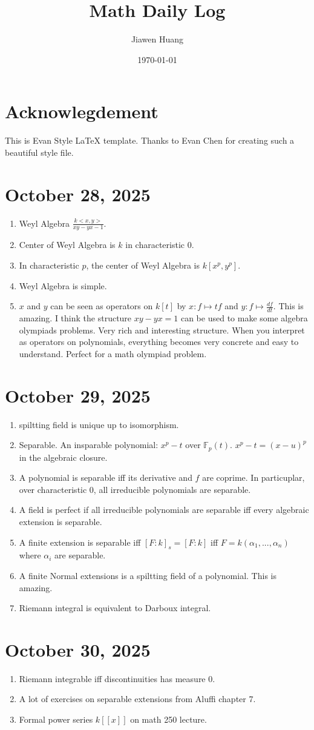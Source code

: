 \documentclass[15pt]{scrartcl}
\begin{document}
\title{Math Daily Log}
\date{\today}
\author{Jiawen Huang}
\maketitle
\section*{Acknowlegdement}
This is Evan Style LaTeX template. Thanks to Evan Chen for creating such a beautiful style file.
\section*{October 28, 2025}
\begin{enumerate}
\item Weyl Algebra $\frac{k<x,y>}{xy-yx-1}$. 
\item Center of Weyl Algebra is $k$ in characteristic 0.
\item In characteristic $p$, the center of Weyl Algebra is $k[x^p,y^p]$.
\item Weyl Algebra is simple.
\item $x$ and $y$ can be seen as operators on $k[t]$ by $x:f\mapsto tf$ and $y:f\mapsto \frac{df}{dt}$. This is amazing. 
I think the structure $xy-yx=1$ can be used to make some algebra olympiads problems. Very rich and interesting structure. 
When you interpret as operators on polynomials, everything becomes very concrete and easy to understand. Perfect for a math olympiad problem.

\end{enumerate}

\section*{October 29, 2025}
\begin{enumerate}
\item spiltting field is unique up to isomorphism.
\item Separable. An insparable polynomial: $x^p-t$ over $\mathbb{F}_p(t)$. $x^p-t=(x-u)^p$ in the algebraic closure. 
\item A polynomial is separable iff its derivative and $f$ are coprime. In particuplar, over characteristic 0, all irreducible polynomials are separable.
\item A field is perfect if all irreducible polynomials are separable iff every algebraic extension is separable. 
\item A finite extension is separable iff $[F:k]_s=[F:k]$ iff $F=k(\alpha_1,...,\alpha_n)$ where $\alpha_i$ are separable.
\item A finite Normal extensions is a spiltting field of a polynomial. This is amazing. 
\item Riemann integral is equivalent to Darboux integral.
\end{enumerate}
\section*{October 30, 2025}
\begin{enumerate}
\item Riemann integrable iff discontinuities has measure 0.
\item A lot of exercises on separable extensions from Aluffi chapter 7. 
\item Formal power series $k[[x]]$ on math 250 lecture. 
\end{enumerate}
\end{document}
